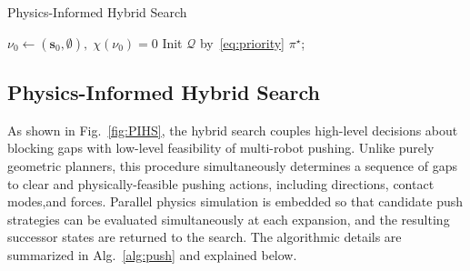\begin{algorithm}[t!]
\caption{Physics-Informed Hybrid Search}\label{alg:push}
\SetAlgoLined
{}

\KwOut{$\pi^\star$}
$\nu_0\gets(\mathbf{s}_0,\emptyset),\;\chi(\nu_0)=0$\;
Init $\mathcal{Q}$ by~\eqref{eq:priority}\;
\Return $\pi^\star$;
\end{algorithm}



\subsection{Physics-Informed Hybrid Search}\label{subsec:simloop}

As shown in Fig.~\ref{fig:PIHS},
the hybrid search couples high-level decisions about blocking gaps with
low-level feasibility of multi-robot pushing. 
Unlike purely geometric planners, 
this procedure simultaneously determines a sequence of gaps to clear
and physically-feasible pushing actions, including directions, contact modes,and forces. 
Parallel physics simulation is embedded so that candidate
push strategies can be evaluated simultaneously at each expansion, and the resulting
successor states are returned to the search.
The algorithmic details are summarized in Alg.~\ref{alg:push}
and explained below.

